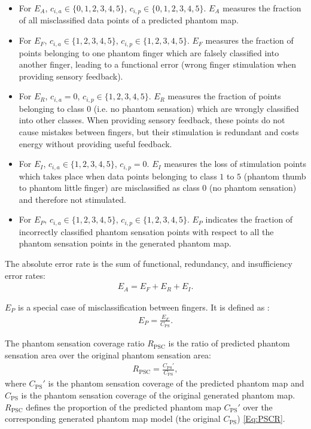 \begin{itemize}
  \item For $E_A$,  $c_{i,a} \in \{0, 1, 2, 3, 4, 5 \}$, $c_{i,p} \in \{0, 1, 2, 3, 4, 5 \}$. $E_A$ measures the fraction of all misclassified data points of a predicted phantom map.
  \item For $E_F$, $c_{i,a} \in \{1, 2, 3, 4, 5 \}$, $c_{i,p} \in \{1, 2, 3, 4, 5 \}$. $E_F$ measures the fraction of points belonging to one phantom finger which are falsely classified into another finger, leading to a functional error (wrong finger stimulation when providing sensory feedback).
  \item For $E_R$, $ c_{i,a} = 0 $, $c_{i,p} \in \{1, 2, 3, 4, 5 \} $. $E_R$ measures the fraction of points  belonging to class $0$ (i.e. no phantom sensation) which are wrongly classified into other classes. When providing sensory feedback, these points do not cause mistakes between fingers, but their stimulation is redundant and costs energy without providing useful feedback. 
  \item For $E_I$, $c_{i,a} \in \{1, 2, 3, 4, 5 \}$, $c_{i,p} = 0 $. $E_I$ measures the loss of stimulation points which takes place when data points belonging to class $1$ to $5$ (phantom thumb to phantom little finger) are misclassified as class $0$ (no phantom sensation) and therefore not stimulated.
  \item For $E_P$, $c_{i,a} \in \{1, 2, 3, 4, 5 \}$, $c_{i,p} \in \{1, 2, 3, 4, 5 \}$. $E_P$ indicates the fraction of incorrectly classified phantom sensation points with respect to all the phantom sensation points in the generated phantom map.
\end{itemize}


The absolute error rate is the sum of functional, redundancy, and insufficiency error rates:
\begin{gather}
\label{Eq:FourAccuracyMetrics}
E_A = E_F + E_R + E_I.
\end{gather}

$E_P$ is a special case of misclassification between fingers. It is defined as :
\begin{gather}
\label{Eq:FourAccuracyMetrics}
E_P =\frac{ E_F } { C_{\text{PS}}}.
\end{gather}

The phantom sensation coverage ratio $R_{\text{PSC}}$  is the ratio of predicted phantom sensation area over the original phantom sensation area:
\begin{gather}
\label{Eq:PSCR}
R_{\text{PSC}} = \frac{C_{\text{PS}}'}{C_{\text{PS}} },
\end{gather}
where $C_{\text{PS}}'$ is the phantom sensation coverage of the predicted phantom map and $C_{\text{PS}}$ is the phantom sensation coverage of the original generated phantom map.
$R_{\text{PSC}}$ defines the proportion of the predicted phantom map $C_{\text{PS}}'$ over the corresponding generated phantom map model (the original $C_{\text{PS}}$) \eqref{Eq:PSCR}.


